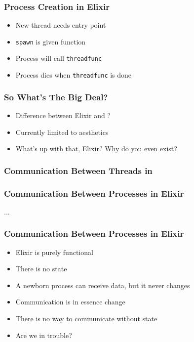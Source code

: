 \begin{frame}
    \frametitle{Process Creation in Elixir}
    \begin{itemize}
        \item New thread needs entry point
        \item \texttt{spawn} is given function
        \item Process will call \texttt{threadfunc}
        \item Process dies when \texttt{threadfunc} is done
    \end{itemize}
\end{frame}

\begin{frame}
    \frametitle{So What's The Big Deal?}
    \begin{itemize}
        \item Difference between Elixir and \csharp?
        \item Currently limited to aesthetics
        \item What's up with that, Elixir? Why do you even exist?
    \end{itemize}
\end{frame}

\begin{frame}
    \frametitle{Communication Between Threads in \csharp}
\end{frame}

\begin{frame}
    \frametitle{Communication Between Processes in Elixir}
    \begin{center}
        \Huge ...
    \end{center}
\end{frame}

\begin{frame}
    \frametitle{Communication Between Processes in Elixir}
    \begin{itemize}
        \item Elixir is purely functional
        \item There is no state
        \item A newborn process can receive data, but it never changes
        \item Communication is in essence change
        \item There is no way to communicate without state
        \item Are we in trouble?
    \end{itemize}
\end{frame}

